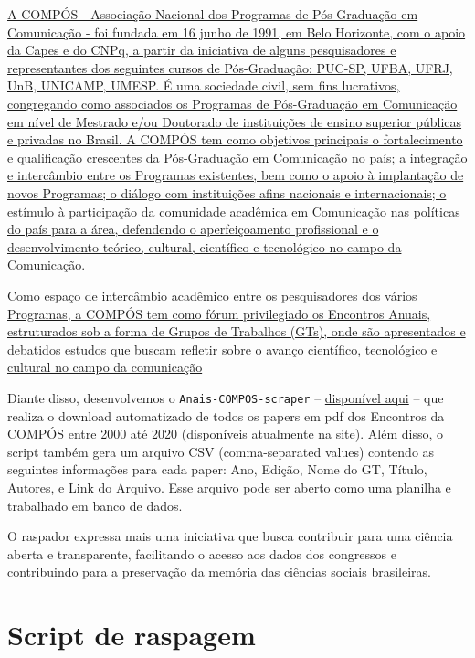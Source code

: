 \documentclass[
]{book}
\begin{document}
\href{https://www.compos.org.br/a_compos.php}{A COMPÓS - Associação Nacional dos Programas de Pós-Graduação em Comunicação - foi fundada em 16 junho de 1991, em Belo Horizonte, com o apoio da Capes e do CNPq, a partir da iniciativa de alguns pesquisadores e representantes dos seguintes cursos de Pós-Graduação: PUC-SP, UFBA, UFRJ, UnB, UNICAMP, UMESP. É uma sociedade civil, sem fins lucrativos, congregando como associados os Programas de Pós-Graduação em Comunicação em nível de Mestrado e/ou Doutorado de instituições de ensino superior públicas e privadas no Brasil. A COMPÓS tem como objetivos principais o fortalecimento e qualificação crescentes da Pós-Graduação em Comunicação no país; a integração e intercâmbio entre os Programas existentes, bem como o apoio à implantação de novos Programas; o diálogo com instituições afins nacionais e internacionais; o estímulo à participação da comunidade acadêmica em Comunicação nas políticas do país para a área, defendendo o aperfeiçoamento profissional e o desenvolvimento teórico, cultural, científico e tecnológico no campo da Comunicação.}

\href{https://www.compos.org.br/encontros_anuais.php}{Como espaço de intercâmbio acadêmico entre os pesquisadores dos vários Programas, a COMPÓS tem como fórum privilegiado os Encontros Anuais, estruturados sob a forma de Grupos de Trabalhos (GTs), onde são apresentados e debatidos estudos que buscam refletir sobre o avanço científico, tecnológico e cultural no campo da comunicação}

Diante disso, desenvolvemos o \texttt{Anais-COMPOS-scraper} -- \href{https://github.com/LABHDUFBA/Anais-COMPOS-scraper}{disponível aqui} -- que realiza o download automatizado de todos os papers em pdf dos Encontros da COMPÓS entre 2000 até 2020 (disponíveis atualmente na site). Além disso, o script também gera um arquivo CSV (comma-separated values) contendo as seguintes informações para cada paper: Ano, Edição, Nome do GT, Título, Autores, e Link do Arquivo. Esse arquivo pode ser aberto como uma planilha e trabalhado em banco de dados.

O raspador expressa mais uma iniciativa que busca contribuir para uma ciência aberta e transparente, facilitando o acesso aos dados dos congressos e contribuindo para a preservação da memória das ciências sociais brasileiras.

\hypertarget{script-de-raspagem-1}{%
\section{Script de raspagem}\label{script-de-raspagem-1}}
\end{document}
